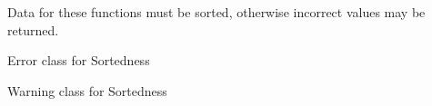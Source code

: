 \documentclass[letterpaper,10pt,english]{sphinxmanual}
\begin{document}
\sphinxAtStartPar
Data for these functions must be sorted, otherwise incorrect values may be
returned.

\begin{fulllineitems}
\label{\detokenize{bisection:geotrees.neighbours.SortedError}}
\pysigstartsignatures
\pysigline
{}
\pysigstopsignatures
\sphinxAtStartPar
Error class for Sortedness

\end{fulllineitems}


\begin{fulllineitems}
\label{\detokenize{bisection:geotrees.neighbours.SortedWarning}}
\pysigstartsignatures
\pysigline
{}
\pysigstopsignatures
\sphinxAtStartPar
Warning class for Sortedness

\end{fulllineitems}

\end{document}
